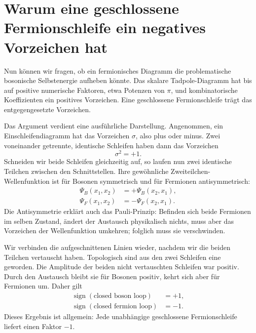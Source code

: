 \section{Warum eine geschlossene Fermionschleife ein negatives Vorzeichen hat}

Nun können wir fragen, ob ein fermionisches Diagramm die problematische bosonische Selbstenergie aufheben könnte. Das skalare Tadpole-Diagramm hat bis auf positive numerische Faktoren, etwa Potenzen von \(\pi\), und kombinatorische Koeffizienten ein positives Vorzeichen. Eine geschlossene Fermionschleife trägt das entgegengesetzte Vorzeichen.

\begin{classroomqa}
\end{classroomqa}

Das Argument verdient eine ausführliche Darstellung. Angenommen, ein Einschleifendiagramm hat das Vorzeichen \(\sigma\), also plus oder minus. Zwei voneinander getrennte, identische Schleifen haben dann das Vorzeichen
\begin{equation}
\sigma^2=+1.
\end{equation}
Schneiden wir beide Schleifen gleichzeitig auf, so laufen nun zwei identische Teilchen zwischen den Schnittstellen. Ihre gewöhnliche Zweiteilchen-Wellenfunktion ist für Bosonen symmetrisch und für Fermionen antisymmetrisch:
\begin{align}
\Psi_B(x_1,x_2)&=+\Psi_B(x_2,x_1),\\
\Psi_F(x_1,x_2)&=-\Psi_F(x_2,x_1).
\end{align}
Die Antisymmetrie erklärt auch das Pauli-Prinzip: Befinden sich beide Fermionen im selben Zustand, ändert der Austausch physikalisch nichts, muss aber das Vorzeichen der Wellenfunktion umkehren; folglich muss sie verschwinden.

Wir verbinden die aufgeschnittenen Linien wieder, nachdem wir die beiden Teilchen vertauscht haben. Topologisch sind aus den zwei Schleifen eine geworden. Die Amplitude der beiden nicht vertauschten Schleifen war positiv. Durch den Austausch bleibt sie für Bosonen positiv, kehrt sich aber für Fermionen um. Daher gilt
\begin{equation}
\begin{aligned}
\operatorname{sign}(\text{closed boson loop})&=+1,\\
\operatorname{sign}(\text{closed fermion loop})&=-1.
\end{aligned}
\end{equation}
Dieses Ergebnis ist allgemein: Jede unabhängige geschlossene Fermionschleife liefert einen Faktor \(-1\).

